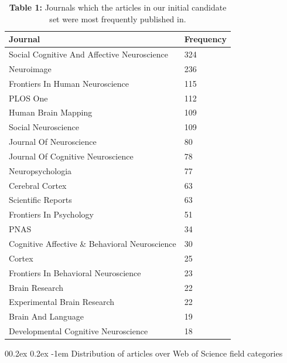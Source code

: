 \documentclass[
  man,floatsintext]{apa6}
\makeatletter
\let\oldparagraph\paragraph
\renewcommand{\paragraph}[1]{\oldparagraph{#1}\mbox{}}
\renewcommand{\paragraph}{\@startsection{paragraph}{4}{\parindent}%
  {0\baselineskip \@plus 0.2ex \@minus 0.2ex}%
  {-1em}%
  {\normalfont\normalsize\bfseries\itshape\typesectitle}}
\makeatother
\begin{document}
\begin{table}[tbp]

\begin{center}
\begin{threeparttable}

\caption{\label{tab:tab1}\textbf{Table 1:} Journals which the articles in our initial candidate set were most frequently published in.}

\begin{tabular}{ll}
\toprule
Journal & \multicolumn{1}{c}{Frequency}\\
\midrule
Social Cognitive And Affective Neuroscience & 324\\
Neuroimage & 236\\
Frontiers In Human Neuroscience & 115\\
PLOS One & 112\\
Human Brain Mapping & 109\\
Social Neuroscience & 109\\
Journal Of Neuroscience & 80\\
Journal Of Cognitive Neuroscience & 78\\
Neuropsychologia & 77\\
Cerebral Cortex & 63\\
Scientific Reports & 63\\
Frontiers In Psychology & 51\\
PNAS & 34\\
Cognitive Affective \& Behavioral Neuroscience & 30\\
Cortex & 25\\
Frontiers In Behavioral Neuroscience & 23\\
Brain Research & 22\\
Experimental Brain Research & 22\\
Brain And Language & 19\\
Developmental Cognitive Neuroscience & 18\\
\bottomrule
\end{tabular}

\end{threeparttable}
\end{center}

\end{table}

\hypertarget{distribution-of-articles-over-web-of-science-field-categories}{%
\paragraph{Distribution of articles over Web of Science field categories}\label{distribution-of-articles-over-web-of-science-field-categories}}
\end{document}
